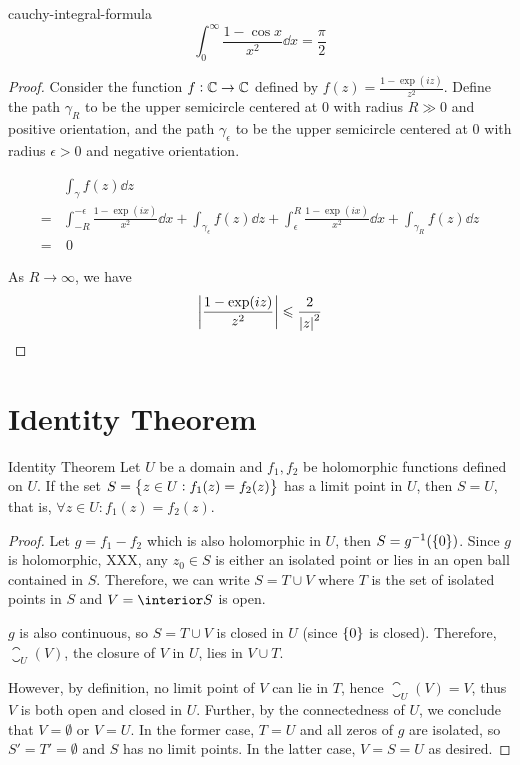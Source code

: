 \documentclass{styles/tufte}
\begin{document}
  
  \begin{example}{}{cauchy-integral-formula}
    \[ \int_0^\infty \frac{1 - \cos x}{x^2} \dd{x} = \frac{\pi}{2} \]
  \end{example}
  \begin{proof}
    Consider the function $f: \mathbb{C} \to \mathbb{C}$ defined by $f(z) = \frac{1 - \exp(iz)}{z^2}$. Define the path $\gamma_R$ to be the upper semicircle centered at 0 with radius $R \gg 0$ and positive orientation, and the path $\gamma_\epsilon$ to be the upper semicircle centered at 0 with radius $\epsilon > 0$ and negative orientation.
    
    \begin{align*}
      &\int_\gamma f(z) \dd{z} \\
      = &\int_{-R}^{-\epsilon} \frac{1 - \exp(ix)}{x^2} \dd{x} + \int_{\gamma_\epsilon} f(z) \dd{z} + \int_{\epsilon}^{R} \frac{1 - \exp(ix)}{x^2} \dd{x} + \int_{\gamma_R} f(z) \dd{z} \\
      = &\ 0
    \end{align*}
    
    As $R \to \infty$, we have
    \[ \abs{\frac{1 - \exp(iz)}{z^2}} \leqslant \frac{2}{\abs{z}^2} \]
  \end{proof}





\section{Identity Theorem}

\begin{theorem}{Identity Theorem}{}
  Let $U$ be a domain and $f_1, f_2$ be holomorphic functions defined on $U$. If the set $S = \set{z \in U: f_1(z) = f_2(z)}$ has a limit point in $U$, then $S = U$, that is, $\forall z \in U: f_1(z) = f_2(z)$.
\end{theorem}
\begin{proof} %
  Let $g = f_1 - f_2$ which is also holomorphic in $U$, then $S = g^{-1}(\set{0})$. Since $g$ is holomorphic, XXX, any $z_0 \in S$ is either an isolated point or lies in an open ball contained in $S$. Therefore, we can write $S = T \cup V$ where $T$ is the set of isolated points in $S$ and $V = \interior S$ is open.
  
  $g$ is also continuous, so $S = T \cup V$ is closed in $U$ (since $\set{0}$ is closed). Therefore, $\closure_U(V)$, the closure of $V$ in $U$, lies in $V \cup T$.
  
  However, by definition, no limit point of $V$ can lie in $T$, hence $\closure_U(V) = V$, thus $V$ is both open and closed in $U$. Further, by the connectedness of $U$, we conclude that $V = \emptyset$ or $V = U$. In the former case, $T = U$ and all zeros of $g$ are isolated, so $S' = T' = \emptyset$ and $S$ has no limit points. In the latter case, $V = S = U$ as desired.
\end{proof}
\end{document}
